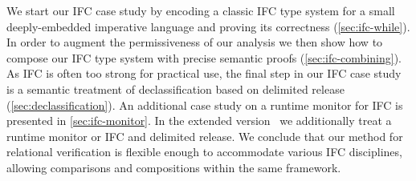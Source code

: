 \documentclass[sigplan,screen]{acmart}\settopmatter{}
\newcommand\citepos[1]{\citeauthor{#1}'s\ \citeyear{#1}}
\newcommand\fstar{F$^\star$\xspace}
\newcommand{\comm}[3]{\ifcheckpagebudget\else\ifdraft{\maybecolor{#1}[#2: #3]}\fi\fi}
\newcommand{\nig}[1]{\comm{dkgreen}{Niklas}{#1}}
\begin{document}
We start our IFC case study by encoding a classic IFC type system 
\citep{volpano1996ifc} for a small deeply-embedded imperative
language and proving its correctness (\autoref{sec:ifc-while}).
In order to augment the permissiveness of our analysis we then show how to
compose our IFC type system with precise semantic proofs
(\autoref{sec:ifc-combining}).
\iffull
As IFC is often too strong for practical use, the final step in our IFC case
study is a semantic treatment of declassification based on delimited release
\citep{SabelfeldMyers03DL} (\autoref{sec:declassification}). An additional case
study on a runtime monitor for IFC is presented in \autoref{sec:ifc-monitor}.
\else
In the extended version~\cite{relational} we additionally treat a runtime monitor or IFC and 
delimited release. 
\fi
%
%
%
%
%
We conclude that our method for relational
verification is flexible enough to accommodate various IFC
disciplines, allowing comparisons and compositions within the same
framework.
\end{document}
